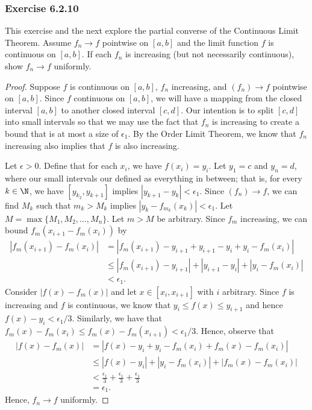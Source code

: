 \subsubsection{Exercise 6.2.10} This exercise and the next explore the partial converse of the Continuous Limit Theorem. Assume \( f_n \to f  \) pointwise on \( [a,b]  \) and the limit function \( f  \) is continuous on \( [a,b]  \). If each \( f_n  \) is increasing (but not necessarily continuous), show \( f_n \to f  \) uniformly.

\begin{proof}
    Suppose \( f  \) is continuous on \( [a,b]  \), \( f_n  \) increasing, and \( (f_n) \to f  \) pointwise on \( [a,b]  \). Since \( f  \) continuous on \( [a,b]  \), we will have a mapping from the closed interval \( [a,b]  \) to another closed interval \( [c,d]  \). Our intention is to split \( [c,d]  \) into small intervals so that we may use the fact that \( f_n  \) is increasing to create a bound that is at most a size of \( \epsilon_1 \). By the Order Limit Theorem, we know that \( f_n  \) increasing also implies that \( f  \) is also increasing. 

    Let \( \epsilon > 0  \). Define that for each \( x_i  \), we have \( f(x_i) = y_i   \). Let \( y_1 = c  \) and \( y_n = d  \), where our small intervals our defined as everything in between; that is, for every \( k \in \N  \), we have \( [y_{k_2 }, y_{k+1} ] \) implies \( | y_{k+1} - y_k  | < \epsilon_1 \).  Since \( (f_n) \to f  \), we can find \( M_k  \) such that \( m_k > M_k  \) implies \( | y_k - f_{m_k} (x_k)  | < \epsilon_1 \). Let \( M = \max \{ M_1, M_2, \dots, M_n  \}  \). Let \( m > M  \) be arbitrary. Since \( f_m  \) increasing, we can bound \( f_m(x_{i+1} - f_m(x_i) ) \) by 
    \begin{align*}
        | f_m(x_{i+1}) - f_m(x_i)  | &= | f_m(x_{i+1}) - y_{i+1} + y_{i+1} - y_i + y_i - f_m(x_i)  |  \\
                                     &\leq | f_m(x_{i+1}) - y_{i+1}  | + | y_{i+1} - y_i  | + | y_i - f_m(x_i)  | \\
                                     &< \epsilon_1.
    \end{align*}
    Consider \( | f(x) - f_m(x)  |  \) and let \( x \in [x_i, x_{i+1} ] \) with \( i  \) arbitrary. Since \( f  \) is increasing and \( f  \) is continuous, we know that \( y_i \leq f(x) \leq y_{i+1}  \) and hence \( f(x) -  y_i  < \epsilon_1 / 3 \). Similarly, we have that \( f_m(x) - f_m(x_i)  \leq f_m(x) - f_m(x_{i+1} ) < \epsilon_1 / 3 \). Hence, observe that 
    \begin{align*}
        | f(x) - f_m(x)  | &= | f(x) - y_i + y_i - f_m(x_i) + f_m(x) - f_m(x_i) |  \\
                           &\leq | f(x) - y_i | + | y_i - f_m(x_i)  | + | f_m(x) - f_m(x_i)  | \\
                           &< \frac{ \epsilon_1 }{ 3 } +  \frac{ \epsilon_1  }{ 3 } + \frac{ \epsilon_1  }{ 3  } \\
                           &= \epsilon_1.
    \end{align*}
    Hence, \( f_n \to f  \) uniformly.
\end{proof}




